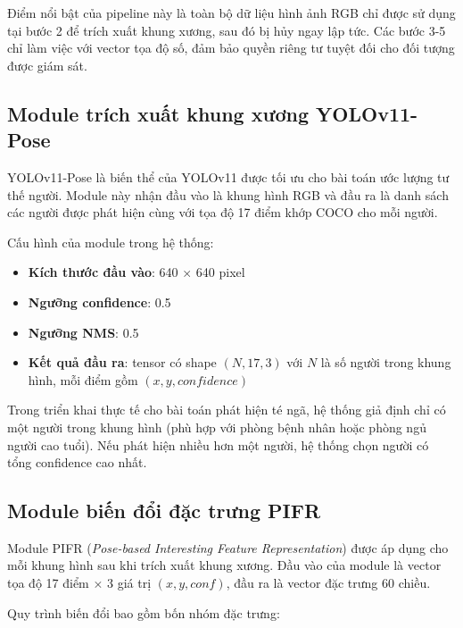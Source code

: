Điểm nổi bật của pipeline này là toàn bộ dữ liệu hình ảnh RGB chỉ được sử dụng tại bước 2 để trích xuất khung xương, sau đó bị hủy ngay lập tức. Các bước 3-5 chỉ làm việc với vector tọa độ số, đảm bảo quyền riêng tư tuyệt đối cho đối tượng được giám sát.

\subsection{Module trích xuất khung xương YOLOv11-Pose}
\label{sec:yolo_pose_module}

YOLOv11-Pose là biến thể của YOLOv11 được tối ưu cho bài toán ước lượng tư thế người. Module này nhận đầu vào là khung hình RGB và đầu ra là danh sách các người được phát hiện cùng với tọa độ 17 điểm khớp COCO cho mỗi người.

Cấu hình của module trong hệ thống:

\begin{itemize}
    \item \textbf{Kích thước đầu vào}: 640 × 640 pixel
    \item \textbf{Ngưỡng confidence}: 0.5
    \item \textbf{Ngưỡng NMS}: 0.5
    \item \textbf{Kết quả đầu ra}: tensor có shape $(N, 17, 3)$ với $N$ là số người trong khung hình, mỗi điểm gồm $(x, y, confidence)$
\end{itemize}

Trong triển khai thực tế cho bài toán phát hiện té ngã, hệ thống giả định chỉ có một người trong khung hình (phù hợp với phòng bệnh nhân hoặc phòng ngủ người cao tuổi). Nếu phát hiện nhiều hơn một người, hệ thống chọn người có tổng confidence cao nhất.

\subsection{Module biến đổi đặc trưng PIFR}
\label{sec:pifr_module_detail}

Module PIFR (\textit{Pose-based Interesting Feature Representation}) được áp dụng cho mỗi khung hình sau khi trích xuất khung xương. Đầu vào của module là vector tọa độ 17 điểm × 3 giá trị $(x, y, conf)$, đầu ra là vector đặc trưng 60 chiều.

Quy trình biến đổi bao gồm bốn nhóm đặc trưng:

